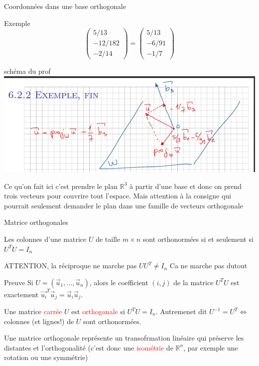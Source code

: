 \begin{parag}{Coordonnées dans une base orthogonale}
\begin{subparag}{Exemple}
\[\begin{pmatrix}
            5/13\\-12/182 \\
            -2/14
        \end{pmatrix} = \begin{pmatrix}
            5/13\\
            -6/91\\
            -1/7
        \end{pmatrix}\]
    \end{subparag}
    \begin{subparag}{schéma du prof}
    \includegraphics[scale = 0.75]{Algèbre linéàaire/Screenshot 2024-12-04 101913.png}
    
    \end{subparag}
    \begin{framedremark}
        Ce qu'on fait ici c'est prendre le plan $\mathbb{R}^3$ à partir d'une base et donc on prend trois vecteurs pour couvrire tout l'espace. Mais attention à la consigne qui pourrait seulement demander le plan dans une famille de vecteurs orthogonale
    \end{framedremark}
\end{parag}

\begin{parag}{Matrice orthogonales}
    \begin{theoreme}
        Les colonnes d'une matrice $U$ de taille $m\times n$ sont orthonormées si et seulement si $U^TU = I_n$
    \end{theoreme}
    \begin{framedremark}
        ATTENTION, la réciproque ne marche pas $UU^T \neq I_n$ Ca ne marche pas dutout
    \end{framedremark}
    \begin{subparag}{Preuve}
        Si $U = (\vec{u}_1, \dots, \vec{u}_n)$, alors le coefficient $(i, j)$ de la matrice $U^TU$ est exactement $\vec{u_i}^T\vec{u}_j = \vec{u}_i\vec{u}_j$. 
    \end{subparag}
    \begin{definition}
        Une matrice \textcolor{red}{carrée} $U$ est \textcolor{red}{orthogonale} si $U^TU = I_n$. Autremenet dit $U^{-1} = U^T \Leftrightarrow$ colonnes (et lignes!) de $U$ sont orthonormées.
    \end{definition}
    Une matrice orthogonale représente un transofrmation linéaire qui préserve les distantes et l'orthogonalité (c'est donc une \textcolor{red}{isométrie} de $\mathbb{R}^n$, par exemple une rotation ou une symmétrie)
\end{parag}

